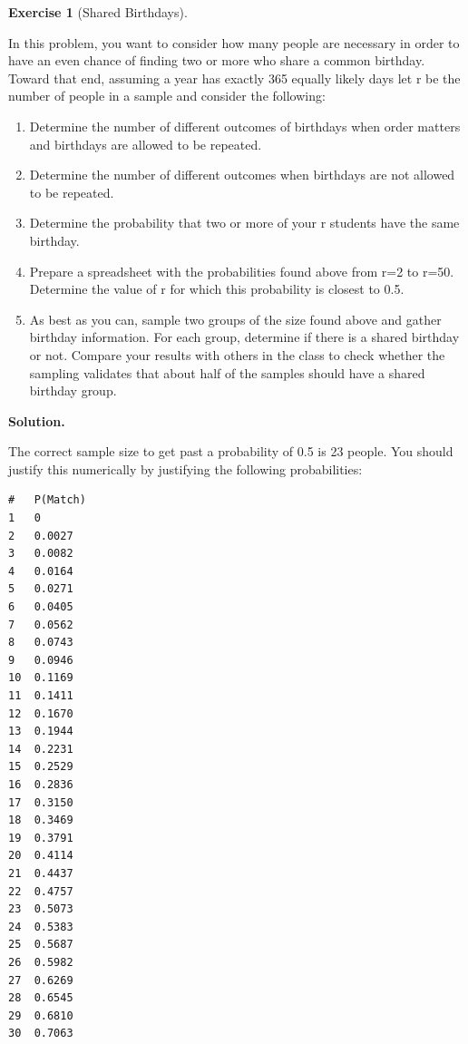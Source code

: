 \documentclass[10pt,]{book}
\theoremstyle{plain}
\theoremstyle{definition}
\theoremstyle{definition}
\theoremstyle{definition}
\newtheorem{exercise}[theorem]{Exercise}
\numberwithin{equation}{section}
\begin{document}
\begin{exercise}[{Shared Birthdays}]\label{exercise-20}

	In this problem, you want to consider how many people are necessary in order to have an even chance of finding two or more who share a common birthday. Toward that end, assuming a year has exactly 365 equally likely days let r be the number of people in a sample and consider the following:
	\leavevmode%
\begin{enumerate}
\item\hypertarget{li-129}{}Determine the number of different outcomes of birthdays when order matters and birthdays are allowed to be repeated.%
\item\hypertarget{li-130}{}Determine the number of different outcomes when birthdays are not allowed to be repeated.%
\item\hypertarget{li-131}{}Determine the probability that two or more of your r students have the same birthday.%
\item\hypertarget{li-132}{}Prepare a spreadsheet with the probabilities found above from r=2 to r=50. Determine the value of r for which this probability is closest to 0.5.%
\item\hypertarget{li-133}{}As best as you can, sample two groups of the size found above and gather birthday information. For each group, determine if there is a shared birthday or not.  Compare your results with others in the class to check whether the sampling validates that about half of the samples should have a shared birthday group.%
\end{enumerate}

\par\smallskip
\noindent\textbf{Solution.}\hypertarget{solution-5}{}\quad

	The correct sample size to get past a probability of 0.5 is 23 people. You should justify this numerically by justifying the following probabilities:
\begin{verbatim}
#	P(Match)	
1	0
2	0.0027
3	0.0082
4	0.0164
5	0.0271
6	0.0405
7	0.0562
8	0.0743
9	0.0946
10	0.1169
11	0.1411
12	0.1670
13	0.1944
14	0.2231
15	0.2529
16	0.2836
17	0.3150
18	0.3469
19	0.3791
20	0.4114
21	0.4437
22	0.4757
23	0.5073
24	0.5383
25	0.5687
26	0.5982
27	0.6269
28	0.6545
29	0.6810
30	0.7063
\end{verbatim}

\end{exercise}
\end{document}
